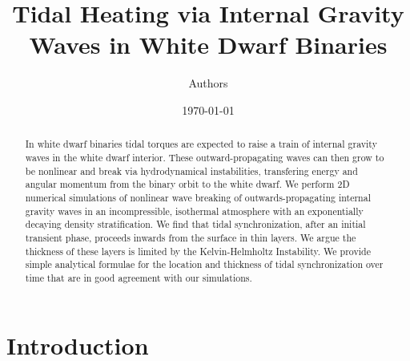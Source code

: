 \documentclass[twocolumn,
        nofootinbib, %
        usenames, %
        aps,
        prd,
        dvipsnames %
    ]{revtex4-1}%
\begin{document}
\def\Snospace~{\S{}} %
\renewcommand*{\sectionautorefname}{\Snospace}
\renewcommand*{\appendixautorefname}{\Snospace}
\renewcommand*{\figureautorefname}{Fig.}
\renewcommand*{\equationautorefname}{Eq.}
\renewcommand*{\tableautorefname}{Tab.}

\begin{abstract}
    In white dwarf binaries tidal torques are expected to raise a train of
    internal gravity waves in the white dwarf interior. These
    outward-propagating waves can then grow to be nonlinear and break via
    hydrodynamical instabilities, transfering energy and angular momentum from
    the binary orbit to the white dwarf. We perform 2D numerical simulations of
    nonlinear wave breaking of outwards-propagating internal gravity waves in an
    incompressible, isothermal atmosphere with an exponentially decaying density
    stratification. We find that tidal synchronization, after an initial
    transient phase, proceeds inwards from the surface in thin layers. We argue
    the thickness of these layers is limited by the Kelvin-Helmholtz
    Instability. We provide simple analytical formulae for the location and
    thickness of tidal synchronization over time that are in good agreement with
    our simulations.
\end{abstract}

\title{Tidal Heating via Internal Gravity Waves in White Dwarf Binaries}
\author{Authors}
\date{\today}
\maketitle

\section{Introduction}



\end{document}

